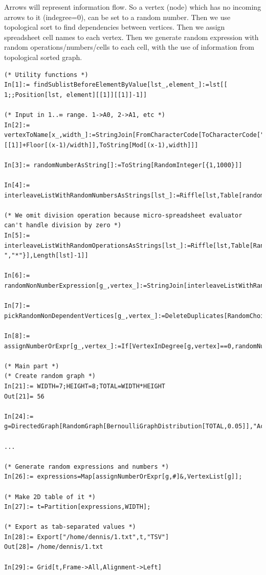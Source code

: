 Arrows will represent information flow.
So a vertex (node) which has no incoming arrows to it (indegree=0), can be set to a random number.
Then we use topological sort to find dependencies between vertices.
Then we assign spreadsheet cell names to each vertex.
Then we generate random expression with random operations/numbers/cells to each cell,
with the use of information from topological sorted graph.

\begin{lstlisting}
(* Utility functions *)
In[1]:= findSublistBeforeElementByValue[lst_,element_]:=lst[[ 1;;Position[lst, element][[1]][[1]]-1]]

(* Input in 1..∞ range. 1->A0, 2->A1, etc *)
In[2]:= vertexToName[x_,width_]:=StringJoin[FromCharacterCode[ToCharacterCode["A"][[1]]+Floor[(x-1)/width]],ToString[Mod[(x-1),width]]]

In[3]:= randomNumberAsString[]:=ToString[RandomInteger[{1,1000}]]

In[4]:= interleaveListWithRandomNumbersAsStrings[lst_]:=Riffle[lst,Table[randomNumberAsString[],Length[lst]-1]]

(* We omit division operation because micro-spreadsheet evaluator can't handle division by zero *)
In[5]:= interleaveListWithRandomOperationsAsStrings[lst_]:=Riffle[lst,Table[RandomChoice[{"+","-","*"}],Length[lst]-1]]

In[6]:= randomNonNumberExpression[g_,vertex_]:=StringJoin[interleaveListWithRandomOperationsAsStrings[interleaveListWithRandomNumbersAsStrings[Map[vertexToName[#,WIDTH]&,pickRandomNonDependentVertices[g,vertex]]]]]

In[7]:= pickRandomNonDependentVertices[g_,vertex_]:=DeleteDuplicates[RandomChoice[findSublistBeforeElementByValue[TopologicalSort[g],vertex],RandomInteger[{1,5}]]]

In[8]:= assignNumberOrExpr[g_,vertex_]:=If[VertexInDegree[g,vertex]==0,randomNumberAsString[],randomNonNumberExpression[g,vertex]]

(* Main part *) 
(* Create random graph *)
In[21]:= WIDTH=7;HEIGHT=8;TOTAL=WIDTH*HEIGHT
Out[21]= 56

In[24]:= g=DirectedGraph[RandomGraph[BernoulliGraphDistribution[TOTAL,0.05]],"Acyclic"];

...

(* Generate random expressions and numbers *)
In[26]:= expressions=Map[assignNumberOrExpr[g,#]&,VertexList[g]];

(* Make 2D table of it *)
In[27]:= t=Partition[expressions,WIDTH];

(* Export as tab-separated values *)
In[28]:= Export["/home/dennis/1.txt",t,"TSV"]
Out[28]= /home/dennis/1.txt

In[29]:= Grid[t,Frame->All,Alignment->Left]
\end{lstlisting}

